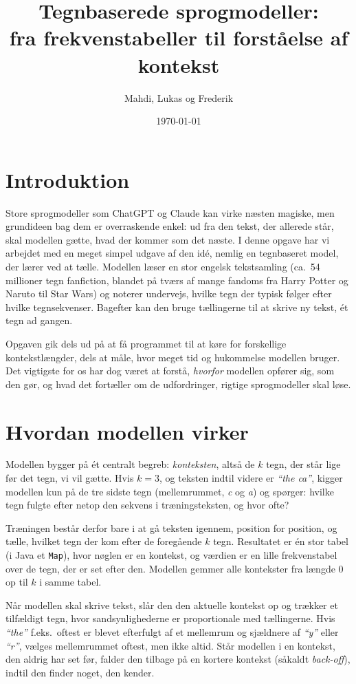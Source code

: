 \documentclass[11pt,a4paper]{article}
\title{Tegnbaserede sprogmodeller: \\ fra frekvenstabeller til forståelse af kontekst}
\author{Mahdi, Lukas og Frederik}
\date{\today}
\begin{document}
\maketitle

\section{Introduktion}

Store sprogmodeller som ChatGPT og Claude kan virke næsten magiske, men grundideen
bag dem er overraskende enkel: ud fra den tekst, der allerede står, skal modellen
gætte, hvad der kommer som det næste. I denne opgave har vi arbejdet med en meget
simpel udgave af den idé, nemlig en tegnbaseret model, der lærer ved at tælle.
Modellen læser en stor engelsk tekstsamling (ca.\ 54 millioner tegn fanfiction,
blandet på tværs af mange fandoms fra Harry Potter og Naruto til Star Wars) og
noterer undervejs, hvilke tegn der typisk følger efter hvilke tegnsekvenser.
Bagefter kan den bruge tællingerne til at skrive ny tekst, ét tegn ad gangen.

Opgaven gik dels ud på at få programmet til at køre for forskellige
kontekstlængder, dels at måle, hvor meget tid og hukommelse modellen bruger. Det
vigtigste for os har dog været at forstå, \emph{hvorfor} modellen opfører sig, som
den gør, og hvad det fortæller om de udfordringer, rigtige sprogmodeller skal løse.

\section{Hvordan modellen virker}

Modellen bygger på ét centralt begreb: \emph{konteksten}, altså de $k$ tegn, der
står lige før det tegn, vi vil gætte. Hvis $k=3$, og teksten indtil videre er
\textit{``the ca''}, kigger modellen kun på de tre sidste tegn (mellemrummet,
\textit{c} og \textit{a}) og spørger: hvilke tegn fulgte efter netop den sekvens i
træningsteksten, og hvor ofte?

Træningen består derfor bare i at gå teksten igennem, position for position, og
tælle, hvilket tegn der kom efter de foregående $k$ tegn. Resultatet er én stor
tabel (i Java et \texttt{Map}), hvor nøglen er en kontekst, og værdien er en lille
frekvenstabel over de tegn, der er set efter den. Modellen gemmer alle kontekster
fra længde 0 op til $k$ i samme tabel.

Når modellen skal skrive tekst, slår den den aktuelle kontekst op og trækker et
tilfældigt tegn, hvor sandsynlighederne er proportionale med tællingerne. Hvis
\textit{``the''} f.eks.\ oftest er blevet efterfulgt af et mellemrum og sjældnere af
\textit{``y''} eller \textit{``r''}, vælges mellemrummet oftest, men ikke altid.
Står modellen i en kontekst, den aldrig har set før, falder den tilbage på en
kortere kontekst (såkaldt \emph{back-off}), indtil den finder noget, den kender.
\end{document}
